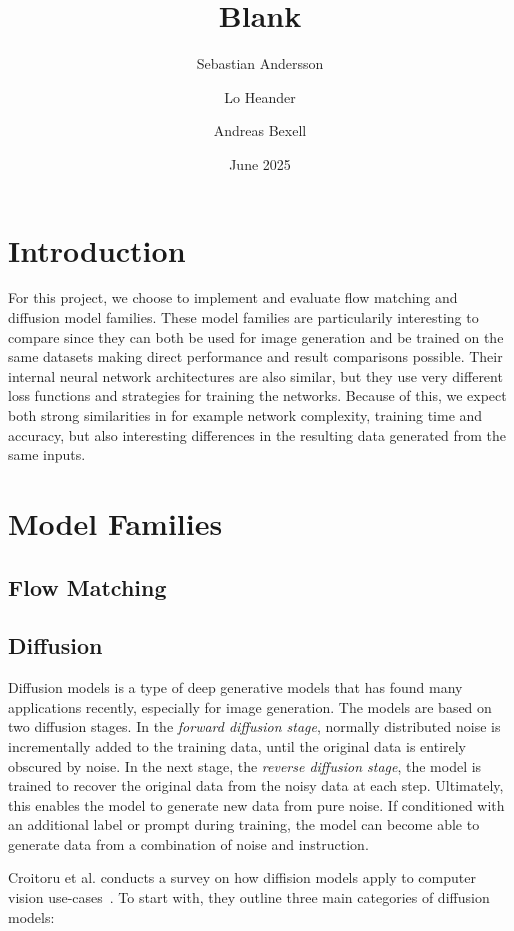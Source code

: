 \documentclass{article}
\title{Blank}
\author{Sebastian Andersson \and Lo Heander \and Andreas Bexell}
\date{June 2025}
\begin{document}
\maketitle

\section{Introduction}

For this project, we choose to implement and evaluate flow matching and diffusion model families. These model families are particularily interesting to compare since they can both be used for image generation and be trained on the same datasets making direct performance and result comparisons possible. Their internal neural network architectures are also similar, but they use very different loss functions and strategies for training the networks. Because of this, we expect both strong similarities in for example network complexity, training time and accuracy, but also interesting differences in the resulting data generated from the same inputs.

\section{Model Families}

\subsection{Flow Matching}

\subsection{Diffusion}

Diffusion models is a type of deep generative models that has found many applications recently, especially for image generation. The models are based on two diffusion stages. In the \emph{forward diffusion stage}, normally distributed noise is incrementally added to the training data, until the original data is entirely obscured by noise. In the next stage, the \emph{reverse diffusion stage}, the model is trained to recover the original data from the noisy data at each step. Ultimately, this enables the model to generate new data from pure noise. If conditioned with an additional label or prompt during training, the model can become able to generate data from a combination of noise and instruction.

Croitoru et al. conducts a survey on how diffision models apply to computer vision use-cases~\cite{croitoru2023diffusion}. To start with, they outline three main categories of diffusion models:
\end{document}
